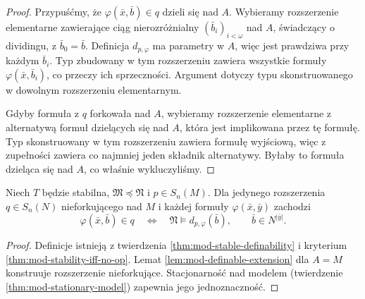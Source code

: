 \begin{proof}
Przypuśćmy, że $\varphi(\bar x,\bar b)\in q$
dzieli się nad $A$. Wybieramy rozszerzenie
elementarne zawierające ciąg nierozróżnialny
$(\bar b_i)_{i<\omega}$ nad $A$,
świadczący o dividingu, z $\bar b_0=\bar b$.
Definicja $d_{p,\varphi}$ ma parametry w $A$,
więc jest prawdziwa przy każdym $\bar b_i$.
Typ zbudowany w tym rozszerzeniu zawiera
wszystkie formuły $\varphi(\bar x,\bar b_i)$,
co przeczy ich sprzeczności.
Argument dotyczy typu skonstruowanego
w dowolnym rozszerzeniu elementarnym.

Gdyby formuła z $q$ forkowała nad $A$,
wybieramy rozszerzenie elementarne z alternatywą
formuł dzielących się nad $A$, która jest
implikowana przez tę formułę.
Typ skonstruowany w tym rozszerzeniu
zawiera formułę wyjściową, więc z zupełności
zawiera co najmniej jeden składnik alternatywy.
Byłaby to formuła dzieląca się nad $A$,
co właśnie wykluczyliśmy.
\end{proof}

\begin{wniosek}
\label{cor:mod-model-nonforking-definitions}
Niech $T$ będzie stabilna,
$\mathfrak M\preccurlyeq\mathfrak N$ i $p\in S_n(M)$.
Dla jedynego rozszerzenia $q\in S_n(N)$
nieforkującego nad $M$ i każdej formuły
$\varphi(\bar x,\bar y)$ zachodzi
\[
\varphi(\bar x,\bar b)\in q
\quad\Longleftrightarrow\quad
\mathfrak N\models d_{p,\varphi}(\bar b),
\qquad \bar b\in N^{|\bar y|}.
\]
\end{wniosek}
\begin{proof}
Definicje istnieją z twierdzenia
\ref{thm:mod-stable-definability}
i kryterium \ref{thm:mod-stability-iff-no-op}.
Lemat \ref{lem:mod-definable-extension}
dla $A=M$ konstruuje rozszerzenie nieforkujące.
Stacjonarność nad modelem
(twierdzenie \ref{thm:mod-stationary-model})
zapewnia jego jednoznaczność.
\end{proof}

